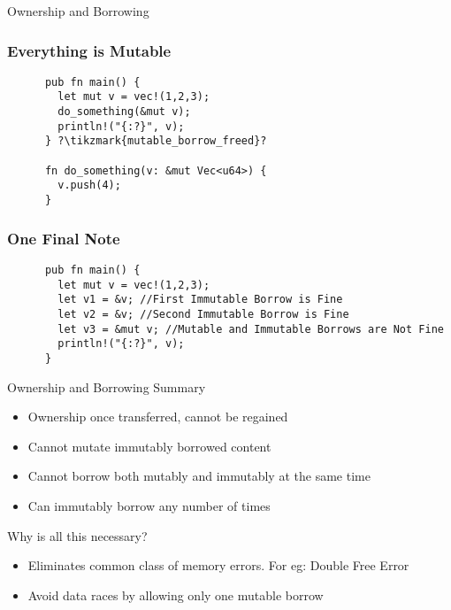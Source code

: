 \begin{section}{Ownership and Borrowing}
  \begin{frame}[fragile]
    \frametitle{Everything is Mutable}
    \begin{verbatim}
      pub fn main() {
        let mut v = vec!(1,2,3);
        do_something(&mut v);
        println!("{:?}", v);
      } ?\tikzmark{mutable_borrow_freed}?

      fn do_something(v: &mut Vec<u64>) {
        v.push(4);
      }
    \end{verbatim}
  \end{frame}

  \begin{frame}[fragile]
    \frametitle{One Final Note \cite{RustLangCh4}}
    \begin{verbatim}
      pub fn main() {
        let mut v = vec!(1,2,3);
        let v1 = &v; //First Immutable Borrow is Fine
        let v2 = &v; //Second Immutable Borrow is Fine
        let v3 = &mut v; //Mutable and Immutable Borrows are Not Fine
        println!("{:?}", v);
      }
    \end{verbatim}
  \end{frame}

  \begin{frame}{Ownership and Borrowing Summary}
    \begin{itemize}
    \item Ownership once transferred, cannot be regained
    \item Cannot mutate immutably borrowed content
    \item Cannot borrow both mutably and immutably at the same time
    \item Can immutably borrow any number of times
    \end{itemize}
  \end{frame}

  \begin{frame}{Why is all this necessary?}
    \begin{itemize}
    \item Eliminates common class of memory errors. For eg: Double Free Error
    \item Avoid data races by allowing only one mutable borrow
    \end{itemize}
  \end{frame}

\end{section}

